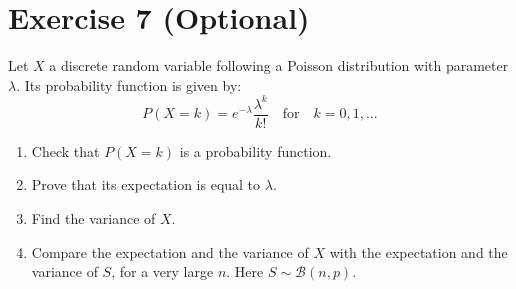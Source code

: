\documentclass[12pt,thmsa]{article}\usepackage[]{graphicx}\usepackage[]{color}
\begin{document}
\section*{Exercise 7 (Optional)}

Let $X$ a discrete random variable following a Poisson distribution with parameter $\lambda$. Its probability function is given by:
\begin{equation*}
P(X=k)=e^{-\lambda} \frac{\lambda^{k}}{k!} \quad \text{for} \quad k=0,1,...
\end{equation*}
\begin{enumerate}
  \item Check that $P(X=k)$ is a probability function.
  \item Prove that its expectation is equal to $\lambda$.
  \item Find the variance of $X$.
  \item Compare the expectation and the variance of $X$ with the expectation and the variance of $S$, for a very large $n$. Here $S \sim \mathcal{B}(n,p)$.
\end{enumerate}
\end{document}
